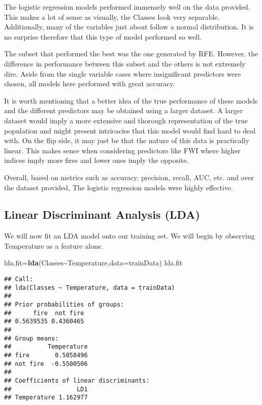 \documentclass[
]{article}
\newenvironment{Shaded}{\begin{snugshade}}{\end{snugshade}}
\newcommand{\AttributeTok}[1]{\textcolor[rgb]{0.13,0.29,0.53}{#1}}
\newcommand{\FunctionTok}[1]{\textcolor[rgb]{0.13,0.29,0.53}{\textbf{#1}}}
\newcommand{\NormalTok}[1]{#1}
\newcommand{\OtherTok}[1]{\textcolor[rgb]{0.56,0.35,0.01}{#1}}
\newcommand{\SpecialCharTok}[1]{\textcolor[rgb]{0.81,0.36,0.00}{\textbf{#1}}}
\begin{document}
The logistic regression models performed immensely well on the data
provided. This makes a lot of sense as visually, the Classes look very
separable. Additionally, many of the variables just about follow a
normal distribution. It is no surprise therefore that this type of model
performed so well.

The subset that performed the best was the one generated by RFE.
However, the difference in performance between this subset and the
others is not extremely dire. Aside from the single variable cases where
insignificant predictors were chosen, all models here performed with
great accuracy.

It is worth mentioning that a better idea of the true performance of
these models and the different predictors may be obtained using a larger
dataset. A larger dataset would imply a more extensive and thorough
representation of the true population and might present intricacies that
this model would find hard to deal with. On the flip side, it may just
be that the nature of this data is practically linear. This makes sense
when considering predictors like FWI where higher indices imply more
fires and lower ones imply the opposite.

Overall, based on metrics such as accuracy, precision, recall, AUC, etc.
and over the dataset provided, The logistic regression models were
highly effective.

\subsection{Linear Discriminant Analysis
(LDA)}\label{linear-discriminant-analysis-lda}

We will now fit an LDA model onto our training set. We will begin by
observing Temperature as a feature alone.

\begin{Shaded}
\begin{Highlighting}[]
\NormalTok{lda.fit}\OtherTok{=}\FunctionTok{lda}\NormalTok{(Classes}\SpecialCharTok{\textasciitilde{}}\NormalTok{Temperature,}\AttributeTok{data=}\NormalTok{trainData)}
\NormalTok{lda.fit}
\end{Highlighting}
\end{Shaded}

\begin{verbatim}
## Call:
## lda(Classes ~ Temperature, data = trainData)
## 
## Prior probabilities of groups:
##      fire  not fire 
## 0.5639535 0.4360465 
## 
## Group means:
##          Temperature
## fire       0.5058496
## not fire  -0.5500506
## 
## Coefficients of linear discriminants:
##                  LD1
## Temperature 1.162977
\end{verbatim}
\end{document}
